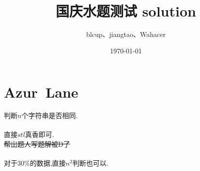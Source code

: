 \documentclass{article}
\begin{document}
\title{国庆水题测试 solution}
\date{\today}
\author{blcup、jiangtao、Wahacer}
\maketitle
\tableofcontents

\newpage
\section{Azur\ Lane}
判断$n$个字符串是否相同.\\
\\
直接$stl$真香即可.\\
\sout{帮出题人写题解被D了}\\
\\
对于$30\%$的数据,直接$n^2$判断也可以.\\
\newpage
\end{document}
